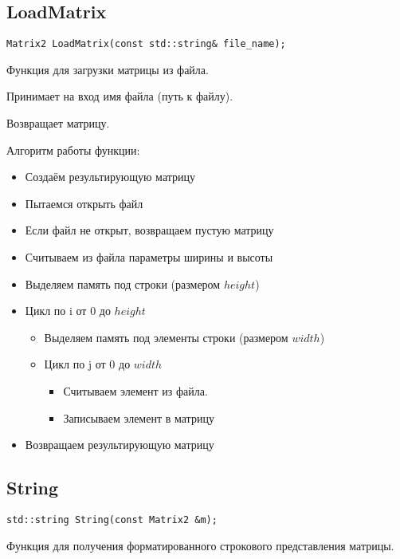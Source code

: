 \subsection*{LoadMatrix}

\begin{lstlisting}[label={lst:LoadMatrix}]
	Matrix2 LoadMatrix(const std::string& file_name);
\end{lstlisting}

Функция для загрузки матрицы из файла.

Принимает на вход имя файла (путь к файлу).

Возвращает матрицу.

Алгоритм работы функции:

\begin{itemize}
	\item Создаём результирующую матрицу
	\item Пытаемся открыть файл
	\item Если файл не открыт, возвращаем пустую матрицу
	\item Считываем из файла параметры ширины и высоты
	\item Выделяем память под строки (размером $ height $)
	\item Цикл по i от 0 до $ height $
	\begin{itemize}
		\item Выделяем память под элементы строки (размером $ width $)
		\item Цикл по j от 0 до $ width $
		\begin{itemize}
			\item Считываем элемент из файла.
			\item Записываем элемент в матрицу
		\end{itemize}
	\end{itemize}
	\item Возвращаем результирующую матрицу
\end{itemize}

\subsection*{String}

\begin{lstlisting}[label={lst:String}]
	std::string String(const Matrix2 &m);
\end{lstlisting}

Функция для получения форматированного строкового представления матрицы.

